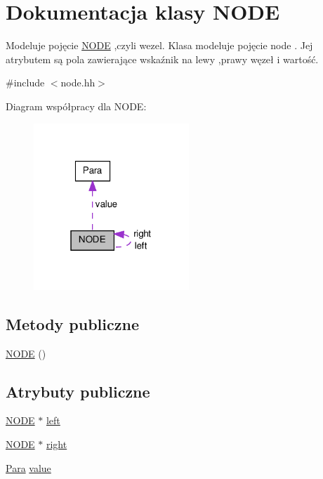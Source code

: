 \hypertarget{class_n_o_d_e}{\section{Dokumentacja klasy N\-O\-D\-E}
\label{class_n_o_d_e}
}


Modeluje pojęcie \hyperlink{class_n_o_d_e}{N\-O\-D\-E} ,czyli wezel. Klasa modeluje pojęcie node . Jej atrybutem są pola zawierające wskaźnik na lewy ,prawy węzeł i wartość.  




{\ttfamily \#include $<$node.\-hh$>$}



Diagram współpracy dla N\-O\-D\-E\-:\nopagebreak
\begin{figure}[H]
\begin{center}
\leavevmode
\includegraphics[width=166pt]{class_n_o_d_e__coll__graph}
\end{center}
\end{figure}
\subsection*{Metody publiczne}
\begin{DoxyCompactItemize}
\item 
\hyperlink{class_n_o_d_e_ad0f54f9f701169888e42f58a2eb8d0b5}{N\-O\-D\-E} ()
\end{DoxyCompactItemize}
\subsection*{Atrybuty publiczne}
\begin{DoxyCompactItemize}
\item 
\hyperlink{class_n_o_d_e}{N\-O\-D\-E} $\ast$ \hyperlink{class_n_o_d_e_a79a9fdf3352d7eeab59e13ee550ec744}{left}
\item 
\hyperlink{class_n_o_d_e}{N\-O\-D\-E} $\ast$ \hyperlink{class_n_o_d_e_a569656ce6663a21e6f00aa3de1128c90}{right}
\item 
\hyperlink{class_para}{Para} \hyperlink{class_n_o_d_e_a1a2031f75d5d983b3e1aef6913a6cc4b}{value}
\end{DoxyCompactItemize}


